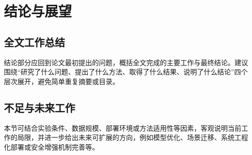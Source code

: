 \section{结论与展望}

\subsection{全文工作总结}

结论部分应回到论文最初提出的问题，概括全文完成的主要工作与最终结论。建议围绕“研究了什么问题、提出了什么方法、取得了什么结果、说明了什么结论”四个层次展开，避免简单重复摘要或目录。

\subsection{不足与未来工作}

本节可结合实验条件、数据规模、部署环境或方法适用性等因素，客观说明当前工作的局限，并进一步给出未来可扩展的方向，例如模型优化、场景迁移、系统工程化部署或安全增强机制完善等。
